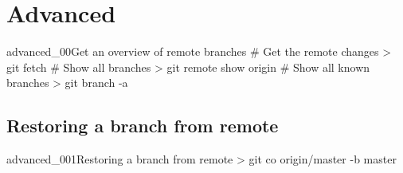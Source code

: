 \section{Advanced}
\begin{codelisting}{advanced_00}{Get an overview of remote branches}
# Get the remote changes
> git fetch
# Show all branches
> git remote show origin
# Show all known branches
> git branch -a
\end{codelisting}
\subsection{Restoring a branch from remote}
\begin{codelisting}{advanced_001}{Restoring a branch from remote}
> git co origin/master -b master
\end{codelisting}
